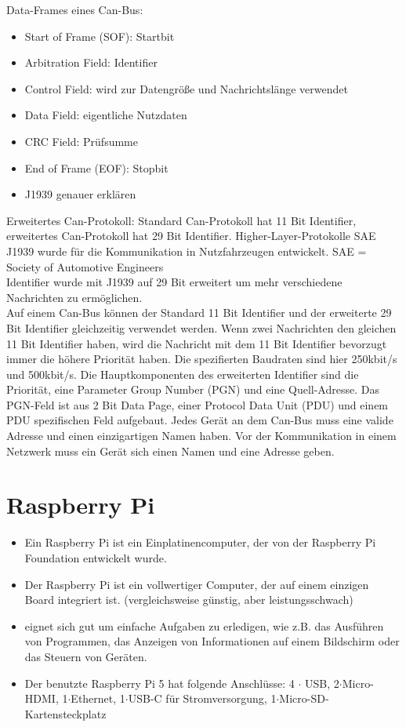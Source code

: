 Data-Frames eines Can-Bus:
\begin{itemize}
    \item Start of Frame (SOF): Startbit
    \item Arbitration Field: Identifier
    \item Control Field: wird zur Datengröße und Nachrichtslänge verwendet
    \item Data Field: eigentliche Nutzdaten
    \item CRC Field: Prüfsumme
    \item End of Frame (EOF): Stopbit
\end{itemize}
\cite[Seite 36]{Voss2008}

\begin{itemize}
    \item J1939 genauer erklären
\end{itemize}
Erweitertes Can-Protokoll: 
Standard Can-Protokoll hat 11 Bit Identifier, erweitertes Can-Protokoll hat 29 Bit Identifier.
Higher-Layer-Protokolle SAE J1939 wurde für die Kommunikation in Nutzfahrzeugen entwickelt.
SAE = Society of Automotive Engineers\\
Identifier wurde mit J1939 auf 29 Bit erweitert um mehr verschiedene Nachrichten zu ermöglichen.\\
Auf einem Can-Bus können der Standard 11 Bit Identifier und der erweiterte 29 Bit Identifier gleichzeitig verwendet werden.
Wenn zwei Nachrichten den gleichen 11 Bit Identifier haben, wird die Nachricht mit dem 11 Bit Identifier bevorzugt immer die
höhere Priorität haben. Die spezifierten Baudraten sind hier 250kbit/s und 500kbit/s. Die Hauptkomponenten des
erweiterten Identifier sind die Priorität, eine Parameter Group Number (PGN) und eine Quell-Adresse.
Das PGN-Feld ist aus 2 Bit Data Page, einer Protocol Data Unit (PDU) und einem PDU spezifischen Feld 
aufgebaut.
Jedes Gerät an dem Can-Bus muss eine valide Adresse und einen einzigartigen Namen haben. Vor 
der Kommunikation in einem Netzwerk muss ein Gerät sich einen Namen und eine Adresse geben.
\cite{Murvay2018}



\section{Raspberry Pi}
\begin{itemize}
    \item Ein Raspberry Pi ist ein Einplatinencomputer, der von der Raspberry Pi Foundation entwickelt wurde.
    \item Der Raspberry Pi ist ein vollwertiger Computer, der auf einem einzigen Board integriert ist. (vergleichsweise günstig, aber leistungsschwach)
    \item eignet sich gut um einfache Aufgaben zu erledigen, wie z.B. das Ausführen von Programmen, das Anzeigen von Informationen auf einem Bildschirm oder das Steuern von Geräten.
    \item Der benutzte Raspberry Pi 5 hat folgende Anschlüsse: 4 $\cdot$ USB, 2$\cdot$Micro-HDMI, 1$\cdot$Ethernet, 1$\cdot$USB-C für Stromversorgung, 1$\cdot$Micro-SD-Kartensteckplatz
\end{itemize}

